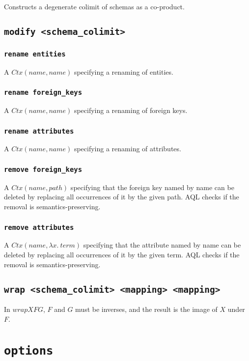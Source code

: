 \documentclass[10pt]{book}
\begin{document}
Constructs a degenerate colimit of schemas as a co-product. 

\section{\tt modify <schema\_colimit>}

\subsection{{\tt rename entities}}
A $Ctx(name,name)$ specifying a renaming of entities.

\subsection{{\tt rename foreign\_keys}}
A $Ctx(name,name)$ specifying a renaming of foreign keys. 

\subsection{{\tt rename attributes}}

A $Ctx(name,name)$ specifying a renaming of attributes. 

\subsection{{\tt remove foreign\_keys}}

A $Ctx(name,path)$ specifying that the foreign key named by name can be deleted by replacing all occurrences of it by the given path.  AQL checks if the removal is semantics-preserving. 

\subsection{{\tt remove attributes}}

A $Ctx(name,\lambda x. \ term)$ specifying that the attribute named by name can be deleted by replacing all occurrences of it by the given term.  AQL checks if the removal is semantics-preserving. 
		
\section{{\tt wrap <schema\_colimit> <mapping> <mapping>}}
In $wrap X F G$, $F$ and $G$ must be inverses, and the result is the image of $X$ under $F$.
		
\chapter{{\tt options}}
\end{document}
